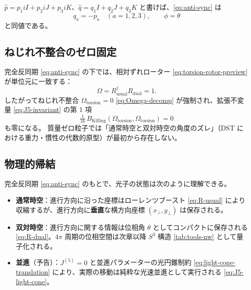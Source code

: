\documentclass[dvipdfmx,a4paper,oneside]{jsbook}
\numberwithin{equation}{chapter}
\begin{document}
\(\hat{p} = p_1 iI + p_2 iJ + p_3 iK\)、\(\hat{q} = q_1 I + q_2 J + q_3 K\) と書けば、\eqref{eq:anti-sync} は
\begin{equation}
  q_a = -p_a \quad (a = 1,2,3), \qquad \phi = \theta
  \label{eq:anti-sync-components}
\end{equation}
と同値である。

\subsection{ねじれ不整合のゼロ固定}

完全反同期 \eqref{eq:anti-sync} の下では、相対ずれローター \eqref{eq:torsion-rotor-preview} が単位元に一致する：
\begin{equation}
  \Omega = R_{\mathrm{usual}}^\dagger R_{\mathrm{dual}} = 1.
  \label{eq:zero-torsion-massless}
\end{equation}
したがってねじれ不整合 \(\Omega_{\mathrm{torsion}} = 0\) \eqref{eq:Omega-decomp} が強制され、拡張不変量 \eqref{eq:J5-invariant} の第 1 項
\begin{equation}
  \tfrac{1}{16}\, B_{\mathrm{Killing}}(\Omega_{\mathrm{torsion}}, \Omega_{\mathrm{torsion}}) = 0
  \label{eq:J5-torsion-zero}
\end{equation}
も零になる。
質量ゼロ粒子では「通常時空と双対時空の角度のズレ」（DST における重力・慣性の代数的原型）が最初から存在しない。

\subsection{物理的帰結}

完全反同期 \eqref{eq:anti-sync} のもとで、光子の状態は次のように理解できる。

\begin{itemize}[leftmargin=2em]
  \item \textbf{通常時空}：進行方向に沿った座標はローレンツブースト \eqref{eq:R-usual} により収縮するが、進行方向に\textbf{垂直}な横方向座標 \((x_\perp, y_\perp)\) は保存される。
  \item \textbf{双対時空}：進行方向に関する情報は位相角 \(\theta\) としてコンパクトに保存される \eqref{eq:R-dual}。\(4\pi\) 周期の位相空間は次章以降 \(S^3\) 構造 \eqref{tab:tools-nw} として量子化される。
  \item \textbf{並進}（予告）：\(J^{(5)} = 0\) と並進パラメーターの光円錐制約 \eqref{eq:light-cone-translation} により、実際の移動は純粋な光速並進として実行される \eqref{eq:J5-light-cone}。
\end{itemize}
\end{document}
